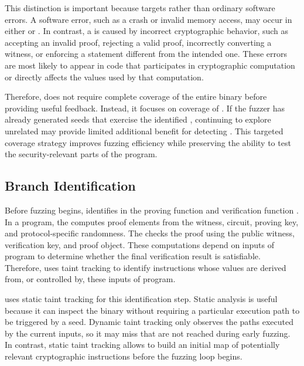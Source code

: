 This distinction is important because \greyboxfuzz targets \logicerror rather than ordinary software errors. A software error, such as a crash or invalid memory access, may occur in either \cryptobranch or \programbranch. In contrast, a \logicerror is caused by incorrect cryptographic behavior, such as accepting an invalid proof, rejecting a valid proof, incorrectly converting a witness, or enforcing a statement different from the intended one. These errors are most likely to appear in code that participates in cryptographic computation or directly affects the values used by that computation.

Therefore, \greyboxfuzz does not require complete coverage of the entire binary before providing useful feedback. Instead, it focuses on coverage of \cryptobranch. If the fuzzer has already generated seeds that exercise the identified \cryptobranch, continuing to explore unrelated \programbranch may provide limited additional benefit for detecting \logicerror. This targeted coverage strategy improves fuzzing efficiency while preserving the ability to test the security-relevant parts of the program.

\subsection{Branch Identification}
\label{subsec:greybox-branch_identify}

Before fuzzing begins, \greyboxfuzz identifies \cryptobranch in the proving function \pprog and verification function \vprog. In a \zksnark program, the \pprog computes proof elements from the witness, circuit, proving key, and protocol-specific randomness. The \vprog checks the proof using the public witness, verification key, and proof object. These computations depend on inputs of \zksnark program to determine whether the final verification result is satisfiable. Therefore, \greyboxfuzz uses taint tracking to identify instructions whose values are derived from, or controlled by, these inputs of \zksnark program.

\greyboxfuzz uses static taint tracking for this identification step. Static analysis is useful because it can inspect the binary without requiring a particular execution path to be triggered by a seed. Dynamic taint tracking only observes the paths executed by the current inputs, so it may miss \cryptobranch that are not reached during early fuzzing. In contrast, static taint tracking allows \greyboxfuzz to build an initial map of potentially relevant cryptographic instructions before the fuzzing loop begins.

